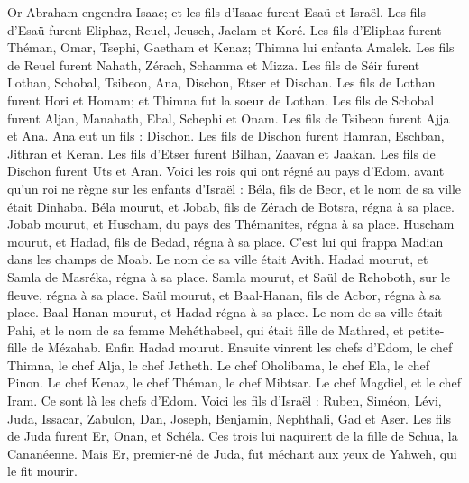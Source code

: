 \begin{multicols}{2}
Or Abraham engendra Isaac; et les fils d'Isaac furent Esaü et Israël.
Les fils d'Esaü furent Eliphaz, Reuel, Jeusch, Jaelam et Koré.
Les fils d'Eliphaz furent Théman, Omar, Tsephi, Gaetham et Kenaz; Thimna lui enfanta Amalek.
Les fils de Reuel furent Nahath, Zérach, Schamma et Mizza.
Les fils de Séir furent Lothan, Schobal, Tsibeon, Ana, Dischon, Etser et Dischan.
Les fils de Lothan furent Hori et Homam; et Thimna fut la soeur de Lothan.
Les fils de Schobal furent Aljan, Manahath, Ebal, Schephi et Onam. Les fils de Tsibeon furent Ajja et Ana.
Ana eut un fils : Dischon. Les fils de Dischon furent Hamran, Eschban, Jithran et Keran.
Les fils d'Etser furent Bilhan, Zaavan et Jaakan. Les fils de Dischon furent Uts et Aran.
Voici les rois qui ont régné au pays d'Edom, avant qu'un roi ne règne sur les enfants d'Israël : Béla, fils de Beor, et le nom de sa ville était Dinhaba.
Béla mourut, et Jobab, fils de Zérach de Botsra, régna à sa place.
Jobab mourut, et Huscham, du pays des Thémanites, régna à sa place.
Huscham mourut, et Hadad, fils de Bedad, régna à sa place. C'est lui qui frappa Madian dans les champs de Moab. Le nom de sa ville était Avith.
Hadad mourut, et Samla de Masréka, régna à sa place.
Samla mourut, et Saül de Rehoboth, sur le fleuve, régna à sa place.
Saül mourut, et Baal-Hanan, fils de Acbor, régna à sa place.
Baal-Hanan mourut, et Hadad régna à sa place. Le nom de sa ville était Pahi, et le nom de sa femme Mehéthabeel, qui était fille de Mathred, et petite- fille de Mézahab.
Enfin Hadad mourut. Ensuite vinrent les chefs d'Edom, le chef Thimna, le chef Alja, le chef Jetheth.
Le chef Oholibama, le chef Ela, le chef Pinon.
Le chef Kenaz, le chef Théman, le chef Mibtsar.
Le chef Magdiel, et le chef Iram. Ce sont là les chefs d'Edom.
\VerseOne{}Voici les fils d'Israël : Ruben, Siméon, Lévi, Juda, Issacar, Zabulon,
Dan, Joseph, Benjamin, Nephthali, Gad et Aser.
Les fils de Juda furent Er, Onan, et Schéla. Ces trois lui naquirent de la fille de Schua, la Cananéenne. Mais Er, premier-né de Juda, fut méchant aux yeux de Yahweh, qui le fit mourir.

\end{multicols}
